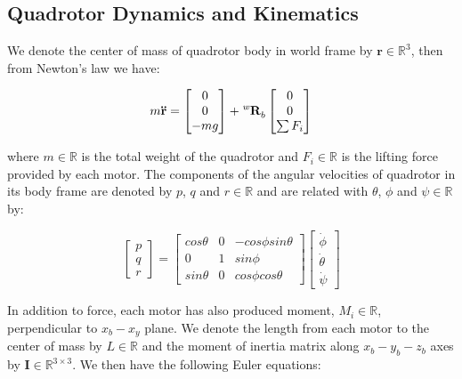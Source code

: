 \subsection{Quadrotor Dynamics and Kinematics}

We denote the center of mass of quadrotor body in world frame by $\mathbf{r}\in\mathbb{R}^3$, then from Newton's law we have:

\begin{equation}\label{eq:newton}
m\mathbf{\ddot{r}}=\begin{bmatrix}0\\0\\-mg\end{bmatrix}+\tensor*[^w]{\mathbf{R}}{_b}\begin{bmatrix}0\\0\\\sum F_i\end{bmatrix}
\end{equation}

where $\mathit{m}\in\mathbb{R}$ is the total weight of the quadrotor and $\mathit{F_i}\in\mathbb{R}$ is the lifting force provided by each motor. The components of the angular velocities of quadrotor in its body frame are denoted by $\mathit{p}$, $\mathit{q}$ and $\mathit{r}\in\mathbb{R}$ and are related with $\theta$, $\phi$ and $\psi\in\mathbb{R}$ by:

\begin{equation}\label{eq:pqr}
\begin{bmatrix}p\\q\\r\end{bmatrix}=\begin{bmatrix}cos\theta&0&-cos\phi sin\theta\\0&1&sin\phi\\sin\theta&0&cos\phi cos\theta\end{bmatrix}\begin{bmatrix}\dot{\phi}\\\dot{\theta}\\\dot{\psi}\end{bmatrix}
\end{equation}

In addition to force, each motor has also produced moment, $\mathit{M_i}\in\mathbb{R}$, perpendicular to $x_b-x_y$ plane. We denote the length from each motor to the center of mass by $\mathit{L}\in\mathbb{R}$ and the moment of inertia matrix along $x_b-y_b-z_b$ axes by $\mathbf{I}\in\mathbb{R}^{3\times3}$. We then have the following Euler equations:

